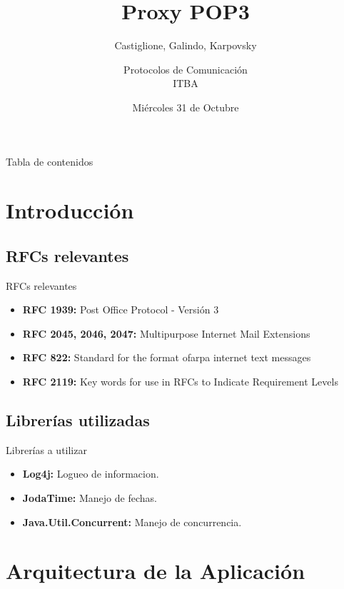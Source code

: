 \documentclass{beamer}
\title{Proxy POP3}
\subtitle{Castiglione, Galindo, Karpovsky}
\author{Protocolos de Comunicación\\  ITBA}
\date{Miércoles 31 de Octubre}
\begin{document}
\frame{\titlepage}
\begin{frame}[allowframebreaks]{Tabla de contenidos}
\tableofcontents
\end{frame}



\section{Introducción}
\subsection{RFCs relevantes}
\begin{frame}{RFCs relevantes}
\begin{itemize}
    \item \textbf{RFC 1939:} Post Office Protocol - Versión 3
    \item \textbf{RFC 2045, 2046, 2047:} Multipurpose Internet Mail Extensions
    \item \textbf{RFC 822:} Standard for the format ofarpa internet text messages
    \item \textbf{RFC 2119:} Key words for use in RFCs to Indicate Requirement Levels
\end{itemize}
\end{frame}

\subsection{Librerías utilizadas}
\begin{frame}{Librerías a utilizar}
\begin{itemize}
    \item \textbf{Log4j:} Logueo de informacion.
    \item \textbf{JodaTime:} Manejo de fechas.
    \item \textbf{Java.Util.Concurrent:} Manejo de concurrencia.
\end{itemize} 
\end{frame}



\section{Arquitectura de la Aplicación}
\end{document}
